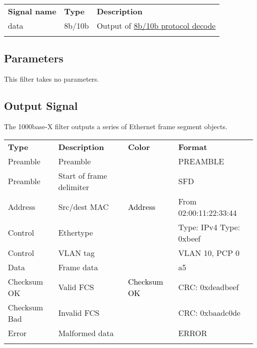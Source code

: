 \begin{tabularx}{16cm}{llX}
\thickhline
\textbf{Signal name} & \textbf{Type} & \textbf{Description} \\
\thickhline
data & 8b/10b & Output of \hyperref[proto:8b10b]{8b/10b protocol decode}\\
\thickhline
\end{tabularx}

\subsection{Parameters}

This filter takes no parameters.

\subsection{Output Signal}

The 1000base-X filter outputs a series of Ethernet frame segment objects.

\begin{tabularx}{16cm}{lllX}
\thickhline
\textbf{Type} & \textbf{Description} & \textbf{Color} & \textbf{Format} \\
\thickhline
Preamble & Preamble & \cellcolor{preamble}\textcolor{white}{Preamble} & PREAMBLE \\
\thickhline
Preamble & Start of frame delimiter & \cellcolor{preamble}\textcolor{white}{Preamble} & SFD \\
\thickhline
Address & Src/dest MAC & \cellcolor{address}\textcolor{black}{Address} & From 02:00:11:22:33:44 \\
\thickhline
Control & Ethertype & \cellcolor{control}\textcolor{white}{Control} & Type: IPv4 \newline Type: 0xbeef \\
\thickhline
Control & VLAN tag & \cellcolor{control}\textcolor{white}{Control} & VLAN 10, PCP 0 \\
\thickhline
Data & Frame data & \cellcolor{data}\textcolor{white}{Data} & a5 \\
\thickhline
Checksum OK & Valid FCS & \cellcolor{checksumok}\textcolor{black}{Checksum OK} & CRC: 0xdeadbeef \\
\thickhline
Checksum Bad & Invalid FCS & \cellcolor{checksumbad}\textcolor{white}{Checksum Bad} & CRC: 0xbaadc0de \\
\thickhline
Error & Malformed data & \cellcolor{error}\textcolor{white}{Error} & ERROR \\
\thickhline
\end{tabularx}

